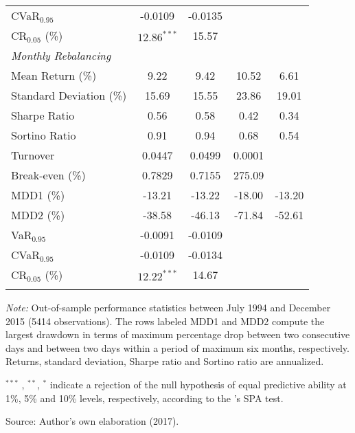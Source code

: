 \documentclass[a4paper,12pt]{report}
\begin{document}
\begin{refsection}
\begin{threeparttable}[H]
\begin{tabularx}{\textwidth}{@{\extracolsep{\fill}}lcccc@{}}
		CVaR$_{0.95}$ & -0.0109 & -0.0135 &  & \\
		CR$_{0.05}$ (\%) & $12.86^{***}$ & 15.57 &  &  \\
		\midrule[\heavyrulewidth] \textit{Monthly Rebalancing} &  &  &  &  \\
		\midrule[\heavyrulewidth] Mean Return (\%) & 9.22 & 9.42 & 10.52 & 6.61
		\\
		Standard Deviation (\%) & 15.69 & 15.55 & 23.86 & 19.01 \\
		Sharpe Ratio & 0.56 & 0.58 & 0.42 & 0.34 \\
		Sortino Ratio & 0.91 & 0.94 & 0.68 & 0.54 \\
		Turnover & 0.0447 & 0.0499 & 0.0001 &  \\
		Break-even (\%) &  0.7829 & 0.7155 & 275.09 &  \\
		MDD1 (\%) & -13.21 & -13.22 & -18.00 & -13.20 \\
		MDD2 (\%) & -38.58 & -46.13 & -71.84 & -52.61 \\
		VaR$_{0.95}$ &  -0.0091 & -0.0109 &  &  \\
		CVaR$_{0.95}$ & -0.0109 & -0.0134 &  &  \\
		CR$_{0.05}$ (\%) & $12.22^{***}$ & 14.67 &  &  \\
		\bottomrule &  &  &  &
	\end{tabularx}%
	\begin{tablenotes}
		\item \textit{Note:} \scriptsize Out-of-sample performance statistics between July 1994 and December 2015 (5414 observations). The rows labeled MDD1 and MDD2 compute the largest drawdown in terms of maximum percentage drop between two consecutive days and between two days within a period of maximum six months, respectively. Returns, standard deviation, Sharpe ratio and Sortino ratio are annualized.
		\item \scriptsize $^{\ast\ast\ast}$ , $^{\ast\ast}$, $^{\ast}$ indicate a rejection of the null hypothesis of equal predictive ability at 1\%, 5\% and 10\% levels, respectively, according to the \citet*{hansen2005test}'s SPA test.
		\item Source: Author's own elaboration (2017).
		
	\end{tablenotes}
	\label{tab:table01}%
\end{threeparttable}

\vspace{0.6cm}


\end{refsection}
\end{document}
